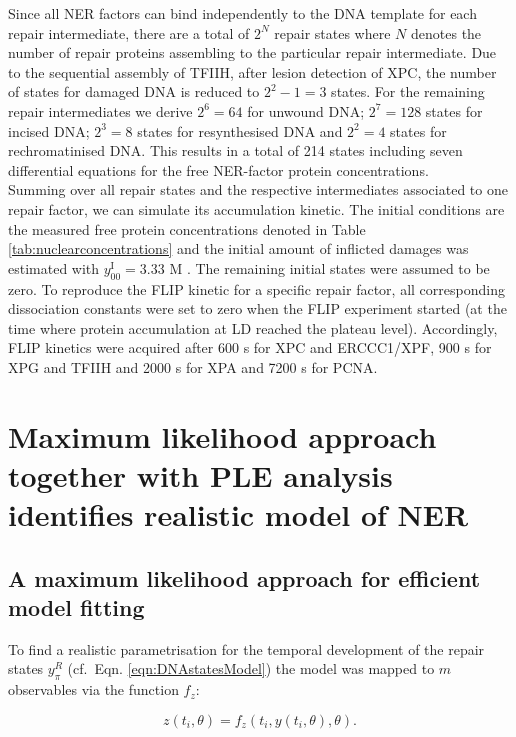 Since all NER factors can bind independently to the DNA template for each repair intermediate, there are a total of $2^N$ repair states where $N$ denotes the number of repair proteins assembling to the particular repair intermediate. Due to the sequential assembly of TFIIH, after lesion detection of XPC, the number of states for damaged DNA is reduced to $ 2^2-1 = 3$ states. For the remaining repair intermediates we derive  $ 2^6 = 64$ for unwound DNA; $ 2^7 = 128$ states for incised DNA; $ 2^3 = 8$ states for resynthesised DNA and $ 2^2 = 4$ states for rechromatinised DNA. This results in a total of 214 states including seven differential equations for the free NER-factor protein concentrations. \\
Summing over all repair states and the respective intermediates associated to one repair factor, we can simulate its accumulation kinetic. The initial conditions are the measured free protein concentrations denoted in Table \ref{tab:nuclearconcentrations}\cite{Terstiege2010,Luijsterburg2010} and the initial amount of inflicted damages was estimated with  $y_{00}^{\text{I}} = 3.33$ \textmu M \cite{Verbruggen2014}. The remaining initial states were assumed to be zero. To reproduce the FLIP kinetic for a specific repair factor, all corresponding dissociation constants were set to zero when the FLIP experiment started (at the time where protein accumulation at LD reached the plateau level). Accordingly, FLIP kinetics were acquired after 600 s for XPC and ERCCC1/XPF, 900 s for XPG and TFIIH and 2000 s for XPA and 7200 s for PCNA. 


 \newpage
\section{Maximum likelihood approach together with PLE analysis identifies realistic model of NER}
\subsection{A maximum likelihood approach for efficient model fitting}
\label{sec:maximumLL}
To find a realistic parametrisation for the temporal development of the repair states $y_\pi^R$ (cf.\ Eqn. \ref{eqn:DNAstatesModel}) the model was mapped to $m$ observables via the function $f_z$:

  \begin{equation}
  	z(t_i,\theta) = f_z(t_i,y(t_i,\theta),\theta).
  	\label{eqn:observable}
  \end{equation} 

